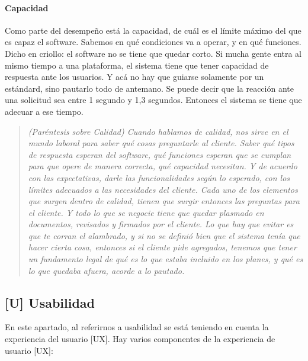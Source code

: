 \hypertarget{capacidad}{%
\paragraph{Capacidad}\label{capacidad}}

Como parte del desempeño está la capacidad, de cuál es el límite máximo
del que es capaz el software. Sabemos en qué condiciones va a operar, y
en qué funciones. Dicho en criollo: el software no se tiene que quedar
corto. Si mucha gente entra al mismo tiempo a una plataforma, el sistema
tiene que tener capacidad de respuesta ante los usuarios. Y acá no hay
que guiarse solamente por un estándard, sino pautarlo todo de antemano.
Se puede decir que la reacción ante una solicitud sea entre 1 segundo y
1,3 segundos. Entonces el sistema se tiene que adecuar a ese tiempo.

\begin{quote}
{\slshape
(Paréntesis sobre Calidad) Cuando hablamos de calidad, nos sirve en el
mundo laboral para saber qué cosas preguntarle al cliente. Saber qué
tipos de respuesta esperan del software, qué funciones esperan que se
cumplan para que opere de manera correcta, qué capacidad necesitan. Y de
acuerdo con las expectativas, darle las funcionalidades según lo
esperado, con los límites adecuados a las necesidades del cliente. Cada
uno de los elementos que surgen dentro de calidad, tienen que surgir
entonces las preguntas para el cliente. Y todo lo que se negocie tiene
que quedar plasmado en documentos, revisados y firmados por el cliente.
Lo que hay que evitar es que te corran el alambrado, y si no se definió
bien que el sistema tenía que hacer cierta cosa, entonces si el cliente
pide agregados, tenemos que tener un fundamento legal de qué es lo que
estaba incluido en los planes, y qué es lo que quedaba afuera, acorde a
lo pautado.
}
\end{quote}

\hypertarget{usabilidad-u}{%
\subsection{%
{[}U{]}
Usabilidad
}\label{usabilidad-u}}

En este apartado, al referirnos a usabilidad se está teniendo en cuenta
la experiencia del usuario {[}UX{]}. Hay varios componentes de la
experiencia de usuario {[}UX{]}:

